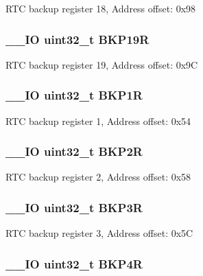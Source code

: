 R\-T\-C backup register 18, Address offset\-: 0x98 \hypertarget{struct_r_t_c___type_def_a4ec1dd54d976989b7c9e59fb14d974fb}{
\subsubsection[{B\-K\-P19\-R}]{\setlength{\rightskip}{0pt plus 5cm}\-\_\-\-\_\-\-I\-O uint32\-\_\-t B\-K\-P19\-R}}\label{struct_r_t_c___type_def_a4ec1dd54d976989b7c9e59fb14d974fb}
R\-T\-C backup register 19, Address offset\-: 0x9\-C \hypertarget{struct_r_t_c___type_def_af85290529fb82acef7c9fcea3718346c}{
\subsubsection[{B\-K\-P1\-R}]{\setlength{\rightskip}{0pt plus 5cm}\-\_\-\-\_\-\-I\-O uint32\-\_\-t B\-K\-P1\-R}}\label{struct_r_t_c___type_def_af85290529fb82acef7c9fcea3718346c}
R\-T\-C backup register 1, Address offset\-: 0x54 \hypertarget{struct_r_t_c___type_def_aaa251a80daa57ad0bd7db75cb3b9cdec}{
\subsubsection[{B\-K\-P2\-R}]{\setlength{\rightskip}{0pt plus 5cm}\-\_\-\-\_\-\-I\-O uint32\-\_\-t B\-K\-P2\-R}}\label{struct_r_t_c___type_def_aaa251a80daa57ad0bd7db75cb3b9cdec}
R\-T\-C backup register 2, Address offset\-: 0x58 \hypertarget{struct_r_t_c___type_def_a0b1eeda834c3cfd4d2c67f242f7b2a1c}{
\subsubsection[{B\-K\-P3\-R}]{\setlength{\rightskip}{0pt plus 5cm}\-\_\-\-\_\-\-I\-O uint32\-\_\-t B\-K\-P3\-R}}\label{struct_r_t_c___type_def_a0b1eeda834c3cfd4d2c67f242f7b2a1c}
R\-T\-C backup register 3, Address offset\-: 0x5\-C \hypertarget{struct_r_t_c___type_def_ab13e106cc2eca92d1f4022df3bfdbcd7}{
\subsubsection[{B\-K\-P4\-R}]{\setlength{\rightskip}{0pt plus 5cm}\-\_\-\-\_\-\-I\-O uint32\-\_\-t B\-K\-P4\-R}}\label{struct_r_t_c___type_def_ab13e106cc2eca92d1f4022df3bfdbcd7}
